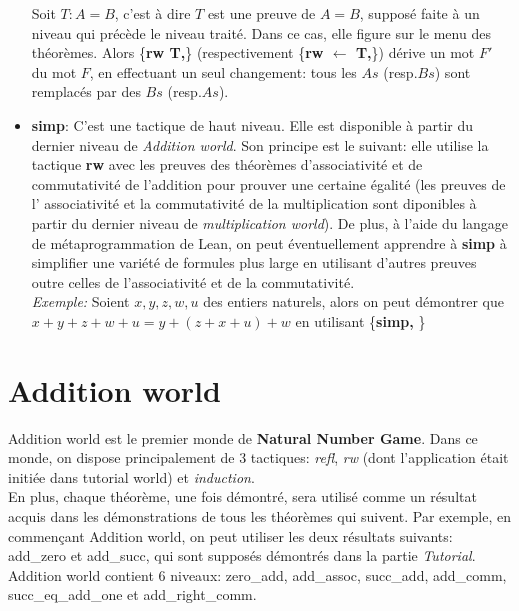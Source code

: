 \documentclass{article}
\begin{document}
\begin{itemize}
    \hspace{1cm} Soit $T: A=B$, c'est à dire $T$ est une preuve de $A=B$, supposé faite à un niveau qui précède le niveau traité. Dans ce cas, elle figure sur le menu des théorèmes. Alors \big\{\textbf{rw T,}\big\} (respectivement \big\{\textbf{rw $\leftarrow$ T,}\big\}) dérive un mot $F'$ du mot $F$, en effectuant un seul changement: tous les $As$ (resp.$Bs$) sont remplacés par des $Bs$ (resp.$As$). 
    \item {\large\textbf{simp}}: C'est une tactique de haut niveau. Elle est disponible à partir du dernier niveau de \textit{Addition world}. Son principe est le suivant: elle utilise la tactique \textbf{rw} avec les preuves des théorèmes d'associativité et de commutativité de l'addition pour prouver une certaine égalité (les preuves de l' associativité et la commutativité de la multiplication sont diponibles à partir du dernier niveau de \textit{multiplication world}). De plus, à l'aide du langage de métaprogrammation de Lean, on peut éventuellement apprendre  à \textbf{simp} à simplifier une variété de formules plus large en utilisant d'autres preuves outre celles de l'associativité et de la commutativité.   \\
    \textit{Exemple:} Soient $x,y,z,w,u$ des entiers naturels, alors on peut démontrer que $x+y+z+w+u=y+(z+x+u)+w$ en utilisant \big\{\textbf{simp,} \big\}
    
    
\end{itemize}


\section{Addition world}
Addition world est le premier monde de \textbf{Natural Number Game}. Dans ce monde, on dispose principalement de 3 tactiques: \textit{refl}, \textit{rw} (dont l'application était initiée dans tutorial world) et \textit{induction}.\\
En plus, chaque théorème, une fois démontré, sera utilisé comme un résultat acquis dans les démonstrations de tous les théorèmes qui suivent. Par exemple, en commençant Addition world, on peut utiliser les deux résultats suivants: add\_zero et add\_succ, qui sont supposés démontrés dans la partie \textit{Tutorial}.\\
Addition world contient 6 niveaux: zero\_add, add\_assoc, succ\_add, add\_comm, succ\_eq\_add\_one et add\_right\_comm.
\end{document}
